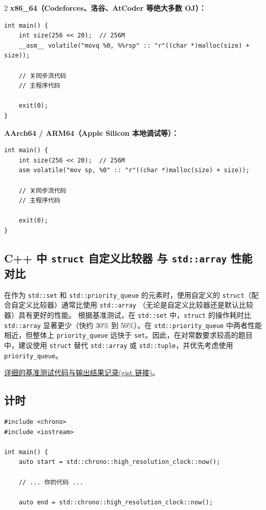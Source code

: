\begin{multicols*}{2}
		\textbf{x86\_64（Codeforces、洛谷、AtCoder 等绝大多数 OJ）：}

		\begin{verbatim}
int main() {
    int size(256 << 20);  // 256M
    __asm__ volatile("movq %0, %%rsp" :: "r"((char *)malloc(size) + size));

    // 关同步流代码
    // 主程序代码

    exit(0);
}
		\end{verbatim}

		\textbf{AArch64 / ARM64（Apple Silicon 本地调试等）：}

		\begin{verbatim}
int main() {
    int size(256 << 20);  // 256M
    asm volatile("mov sp, %0" :: "r"((char *)malloc(size) + size));

    // 关同步流代码
    // 主程序代码

    exit(0);
}
		\end{verbatim}

		\subsection{C++ 中 \texttt{struct} 自定义比较器 与 \texttt{std::array} 性能对比}
		在作为 \texttt{std::set} 和 \texttt{std::priority\_queue} 的元素时，使用自定义的 \texttt{struct}（配合自定义比较器）通常比使用 \texttt{std::array} （无论是自定义比较器还是默认比较器）具有更好的性能。
		根据基准测试，在 \texttt{std::set} 中，\texttt{struct} 的操作耗时比 \texttt{std::array} 显著更少（快约 30\% 到 50\%）。在 \texttt{std::priority\_queue} 中两者性能相近，但整体上 \texttt{priority\_queue} 远快于 \texttt{set}。因此，在对常数要求较高的题目中，建议使用 \texttt{struct} 替代 \texttt{std::array} 或 \texttt{std::tuple}，并优先考虑使用 \texttt{priority\_queue}。

		\href{https://gist.github.com/znzryb/bfc064b51520410569d562619ac0af11}{详细的基准测试代码与输出结果记录(gist 链接)}。

		\subsection{计时}
		\begin{verbatim}
#include <chrono>
#include <iostream>

int main() {
    auto start = std::chrono::high_resolution_clock::now();

    // ... 你的代码 ...

    auto end = std::chrono::high_resolution_clock::now();


\end{verbatim}
\end{multicols*}
